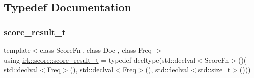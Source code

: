\subsection{Typedef Documentation}
\mbox{\label{namespaceirk_1_1score_af4a2c84b3548a4ac12aac3862bc94875}} 
\subsubsection{\texorpdfstring{score\+\_\+result\+\_\+t}{score\_result\_t}}
{\footnotesize\ttfamily template$<$class Score\+Fn , class Doc , class Freq $>$ \\
using \mbox{\hyperlink{namespaceirk_1_1score_af4a2c84b3548a4ac12aac3862bc94875}{irk\+::score\+::score\+\_\+result\+\_\+t}} = typedef decltype(std\+::declval$<$Score\+Fn$>$()( std\+::declval$<$Freq$>$(), std\+::declval$<$Freq$>$(), std\+::declval$<$std\+::size\+\_\+t$>$()))}

